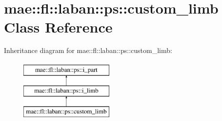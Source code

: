 \hypertarget{classmae_1_1fl_1_1laban_1_1ps_1_1custom__limb}{\section{mae\-:\-:fl\-:\-:laban\-:\-:ps\-:\-:custom\-\_\-limb Class Reference}
\label{classmae_1_1fl_1_1laban_1_1ps_1_1custom__limb}
}
Inheritance diagram for mae\-:\-:fl\-:\-:laban\-:\-:ps\-:\-:custom\-\_\-limb\-:\begin{figure}[H]
\begin{center}
\leavevmode
\includegraphics[height=3.000000cm]{classmae_1_1fl_1_1laban_1_1ps_1_1custom__limb}
\end{center}
\end{figure}
